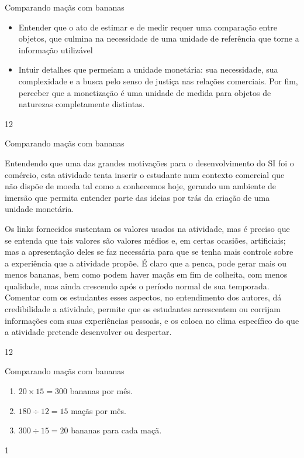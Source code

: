 \clearmargin
\begin{objectives}{Comparando maçãs com bananas}
{
\begin{itemize}
\item Entender que o ato de estimar e de medir requer uma comparação entre objetos, que culmina na necessidade de uma unidade de referência que torne a informação utilizável

\item Intuir detalhes que permeiam a unidade monetária: sua necessidade, sua complexidade e a busca pelo senso de justiça nas relações comerciais. Por fim, perceber que a monetização é uma unidade de medida para objetos de naturezas completamente distintas.
\end{itemize}
}{1}{2}
\end{objectives}
\begin{sugestions}{Comparando maçãs com bananas}
{
Entendendo que uma das grandes motivações para o desenvolvimento do SI foi o comércio, esta atividade tenta inserir o estudante num contexto comercial que não dispõe de moeda tal como a conhecemos hoje, gerando um ambiente de imersão que permita entender parte das ideias por trás da criação de uma unidade monetária.

Os links fornecidos sustentam os valores usados na atividade, mas é preciso que se entenda que tais valores são valores médios e, em certas ocasiões, artificiais; mas a apresentação deles se faz necessária para que se tenha mais controle sobre a experiência que a atividade propõe. É claro que a penca, pode gerar mais ou menos bananas, bem como podem haver maçãs em fim de colheita, com menos qualidade, mas ainda crescendo após o período normal de sua temporada. Comentar com os estudantes esses aspectos, no entendimento dos autores, dá credibilidade a atividade, permite que os estudantes acrescentem ou corrijam informações com suas experiências pessoais, e os coloca no clima específico do que a atividade pretende desenvolver ou despertar.
}{1}{2}
\end{sugestions}
\begin{answer}{Comparando maçãs com bananas}
{
\begin{enumerate}
\item {} 
\(20 \times 15 = 300\) bananas por mês.

\item {} 
\(180 \div 12 = 15\) maçãs por mês.

\item {} 
\(300 \div 15 = 20\) bananas para cada maçã.
\end{enumerate}
}{1}
\end{answer}
